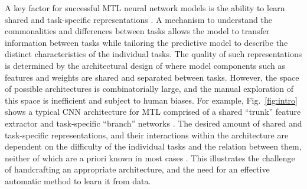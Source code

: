 A key factor for successful MTL neural network models is the ability to learn shared and task-specific representations \cite{MisraCrossMTL16}. A mechanism to understand the commonalities and differences between tasks allows the model to transfer information between tasks while tailoring the predictive model to describe the distinct characteristics of the individual tasks. The quality of such representations is determined by the architectural design of where model components such as features \cite{Ruder2019SluiceNL} and weights \cite{meyerson2018beyond} are shared and separated between tasks. However, the space of possible architectures is combinatorially large, and the manual exploration of this space is inefficient and subject to human biases. For example, Fig.~\ref{fig:intro} shows a typical CNN architecture for MTL comprised of a shared ``trunk'' feature extractor and task-specific ``branch'' networks \cite{tanno2018autodvt,huang2015cross,jou2016deep,kendall2017multi,ranjan2019hyperface, bragman2018multi}. The desired amount of shared and task-specific representations, and their interactions within the architecture are dependent on the difficulty of the individual tasks and the relation between them, neither of which are a priori known in most cases \cite{taskonomy2018}. This illustrates the challenge of handcrafting an appropriate architecture, and the need for an effective automatic method to learn it from data. 



